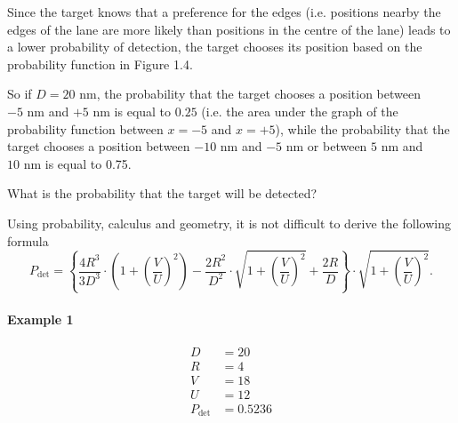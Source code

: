 Since the target knows that a preference for the edges (i.e. positions nearby the edges of the lane are more likely than positions in the centre of the lane) leads to a lower probability of detection, the target chooses its position based on the probability function in Figure 1.4.


So if $D=20\text{ nm}$, the probability that the target chooses a position between $-5\text{ nm}$ and $+5\text{ nm}$ is equal to $0.25$ (i.e. the area under the graph of the probability function between $x=-5$ and $x=+5$), while the probability that the target chooses a position between $-10\text{ nm}$ and $-5\text{ nm}$ or between $5\text{ nm}$ and $10\text{ nm}$ is equal to 0.75.

What is the probability that the target will be detected?

Using probability, calculus and geometry, it is not difficult to derive the following formula
\[
P_{\text{det}} = \left\{ \frac{4R^3}{3D^3} \cdot \left(1 + \left(\frac{V}{U}\right)^2\right) - \frac{2R^2}{D^2} \cdot \sqrt{1 + \left(\frac{V}{U}\right)^2} + \frac{2R}{D} \right\} \cdot \sqrt{1 + \left(\frac{V}{U}\right)^2}.
\]

\paragraph{Example 1}
\begin{align*}
D &= 20 \\
R &= 4 \\
V &= 18 \\
U &= 12 \\
P_{\text{det}} &= 0.5236
\end{align*}